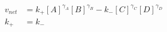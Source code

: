 \begin{eqnarray}
v_{net} & = k_+[A]^{\gamma_A}[B]^{\gamma_B} - k_-[C]^{\gamma_C}[D]^{\gamma_D} \\
k_+ &=  k_- \\
\end{eqnarray}